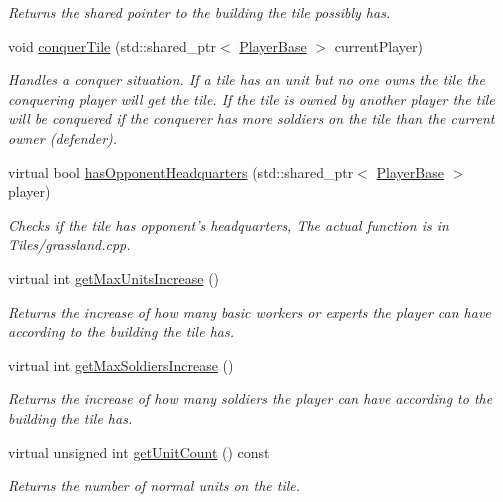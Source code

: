\begin{DoxyCompactItemize}
\begin{DoxyCompactList}\small\item\em Returns the shared pointer to the building the tile possibly has. \end{DoxyCompactList}\item 
void \hyperlink{class_course_1_1_tile_base_ad3b7900a215415e0c5e95340cab1cf30}{conquer\-Tile} (std\-::shared\-\_\-ptr$<$ \hyperlink{class_course_1_1_player_base}{Player\-Base} $>$ current\-Player)
\begin{DoxyCompactList}\small\item\em Handles a conquer situation. If a tile has an unit but no one owns the tile the conquering player will get the tile. If the tile is owned by another player the tile will be conquered if the conquerer has more soldiers on the tile than the current owner (defender). \end{DoxyCompactList}\item 
virtual bool \hyperlink{class_course_1_1_tile_base_aec0f556239d935b4a97a700a3bb70ac5}{has\-Opponent\-Headquarters} (std\-::shared\-\_\-ptr$<$ \hyperlink{class_course_1_1_player_base}{Player\-Base} $>$ player)
\begin{DoxyCompactList}\small\item\em Checks if the tile has opponent's headquarters, The actual function is in Tiles/grassland.\-cpp. \end{DoxyCompactList}\item 
virtual int \hyperlink{class_course_1_1_tile_base_a23ed20f49cac43141776dc45d8ceb9c0}{get\-Max\-Units\-Increase} ()
\begin{DoxyCompactList}\small\item\em Returns the increase of how many basic workers or experts the player can have according to the building the tile has. \end{DoxyCompactList}\item 
virtual int \hyperlink{class_course_1_1_tile_base_ae93137daa766a5984f783cadf0dbf516}{get\-Max\-Soldiers\-Increase} ()
\begin{DoxyCompactList}\small\item\em Returns the increase of how many soldiers the player can have according to the building the tile has. \end{DoxyCompactList}\item 
virtual unsigned int \hyperlink{class_course_1_1_tile_base_a4ebe5a95c14f423f696e43ac0cf3f09a}{get\-Unit\-Count} () const 
\begin{DoxyCompactList}\small\item\em Returns the number of normal units on the tile. \end{DoxyCompactList}\item 

\end{DoxyCompactItemize}
